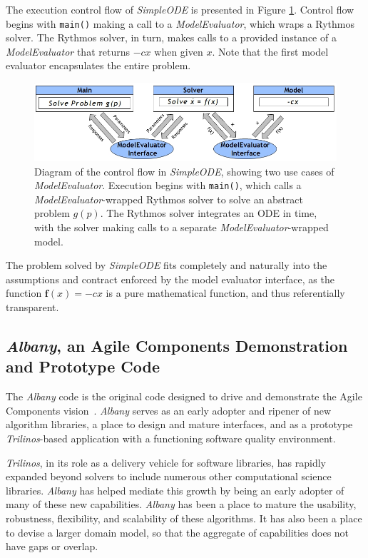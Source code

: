 \documentclass[pdf,ps2pdf,12pt,report]{SANDreport}
\theoremstyle{plain}
\theoremstyle{definition}
\theoremstyle{remark}
\numberwithin{equation}{section}
\begin{document}
The execution control flow of \emph{SimpleODE} is presented in Figure \ref{fig:SimpleODEInterface}.  Control flow begins with \texttt{main()} making a call to a \emph{ModelEvaluator}, which wraps a Rythmos solver. The Rythmos solver, in turn, makes calls to a provided instance of a \emph{ModelEvaluator} that returns $-cx$ when given $x$. Note that the first model evaluator encapsulates the entire problem.

\begin{figure}[h!]
\begin{center}
	\includegraphics[width=\linewidth]{SimpleODEInterface}
 \end{center}
 \caption{Diagram of the control flow in \emph{SimpleODE}, showing two use cases of \emph{ModelEvaluator}. Execution begins with \texttt{main()}, which calls a \emph{ModelEvaluator}-wrapped Rythmos solver to solve an abstract problem $g(p)$. The Rythmos solver integrates an ODE in time, with the solver making calls to a separate \emph{ModelEvaluator}-wrapped model.}
\label{fig:SimpleODEInterface}
\end{figure}

The problem solved by \emph{SimpleODE} fits completely and naturally into the assumptions and contract enforced by the model evaluator interface, as the function $\mathbf{f}(x) = -c x$ is a pure mathematical function, and thus referentially transparent.

\subsection{\emph{Albany}, an Agile Components Demonstration and Prototype Code} \label{sec:albany}

The \emph{Albany} code is the original code designed to drive and demonstrate the Agile Components vision~\cite{AlbanyWebPage:2011}. \emph{Albany} serves as an early adopter and ripener of new algorithm libraries, a place to design and mature interfaces, and as a prototype \emph{Trilinos}-based application with a functioning software quality environment.

\emph{Trilinos}, in its role as a delivery vehicle for software libraries, has rapidly expanded beyond solvers to include numerous other computational science libraries. \emph{Albany} has helped mediate this growth by being an early adopter of many of these new capabilities. \emph{Albany} has been a place to mature the usability, robustness, flexibility, and scalability of these algorithms. It has also been a place to devise a larger domain model, so that the aggregate of capabilities does not have gaps or overlap.
\end{document}
